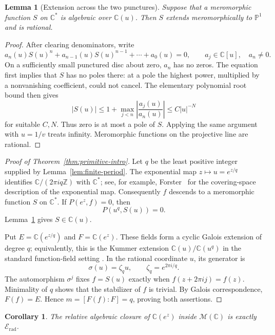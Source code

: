 \documentclass[11pt,reqno]{amsart}
\numberwithin{equation}{section}
\newtheorem{lemma}[theorem]{Lemma}
\newtheorem{corollary}[theorem]{Corollary}
\theoremstyle{definition}
\theoremstyle{remark}
\newcommand{\C}{\mathbb C}
\newcommand{\Z}{\mathbb Z}
\newcommand{\PP}{\mathbb P}
\newcommand{\MM}{\mathcal M}
\newcommand{\Erad}{\mathscr E_{\mathrm{rad}}}
\begin{document}
\begin{lemma}[Extension across the two punctures]
\label{lem:rational-descent}
Suppose that a meromorphic function $S$ on $\C^*$ is algebraic over
$\C(u)$. Then $S$ extends meromorphically to $\PP^1$ and is rational.
\end{lemma}

\begin{proof}
After clearing denominators, write
\[
 a_n(u)S(u)^n+a_{n-1}(u)S(u)^{n-1}+\cdots+a_0(u)=0,
 \qquad a_j\in\C[u],\quad a_n\ne0.
\]
On a sufficiently small punctured disc about zero, $a_n$ has no
zeros. The equation first implies that $S$ has no poles there: at
a pole the highest power, multiplied by a nonvanishing coefficient,
could not cancel. The elementary polynomial root bound then gives
\[
 |S(u)|\leq 1+\max_{j<n}\left|\frac{a_j(u)}{a_n(u)}\right|
 \leq C|u|^{-N}
\]
for suitable $C,N$. Thus zero is at most a pole of $S$. Applying the
same argument with $u=1/v$ treats infinity. Meromorphic functions on
the projective line are rational.
\end{proof}

\begin{proof}[Proof of Theorem~\ref{thm:primitive-intro}]
Let $q$ be the least positive integer supplied by
Lemma~\ref{lem:finite-period}. The exponential map
$z\mapsto u=e^{z/q}$ identifies $\C/(2\pi i q\Z)$ with $\C^*$;
see, for example, Forster~\cite[Section~5]{Forster1981} for the
covering-space description of the exponential map.
Consequently $f$ descends to a meromorphic function $S$ on $\C^*$.
If $P(e^z,f)=0$, then
\[
 P(u^q,S(u))=0.
\]
Lemma~\ref{lem:rational-descent} gives $S\in\C(u)$.

Put $E=\C(e^{z/q})$ and $F=\C(e^z)$. These fields form a cyclic
Galois extension of degree $q$; equivalently, this is the Kummer
extension $\C(u)/\C(u^q)$ in the standard function-field setting
\cite[Chapter~III]{Stichtenoth2009}. In the rational coordinate $u$, its
generator is
\[
 \sigma(u)=\zeta_q u,\qquad \zeta_q=e^{2\pi i/q}.
\]
The automorphism $\sigma^j$ fixes $f=S(u)$ exactly when
$f(z+2\pi i j)=f(z)$. Minimality of $q$ shows that the stabilizer
of $f$ is trivial. By Galois correspondence, $F(f)=E$. Hence
$m=[F(f):F]=q$, proving both assertions.
\end{proof}

\begin{corollary}
\label{cor:algebraic-field}
The relative algebraic closure of $\C(e^z)$ inside $\MM(\C)$ is
exactly $\Erad$.
\end{corollary}
\end{document}
